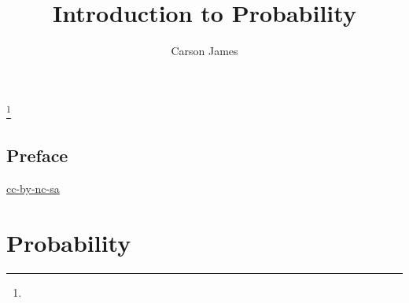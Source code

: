 \documentclass{book}
\begin{document}
	
	\frontmatter
	
	\title{Introduction to Probability}
	
	
	\author{Carson James}
	\thanks{}
	
	\date{}
	
	\maketitle
	
	
	\setcounter{page}{4}
	
	\tableofcontents
	\printunsrtglossary[type=symbols,style=long,title={Notation}]
	
	
	\mainmatter
	
	\chapter*{Preface}
	
	\begin{flushleft}
		\href{https://creativecommons.org/licenses/by-nc-sa/4.0/legalcode.txt}{cc-by-nc-sa}
	\end{flushleft}
	
	\newpage


	
	
	
	
	
	
	
	
	
	
	
	\newpage
	
	\part{Probability}
	
\end{document}
